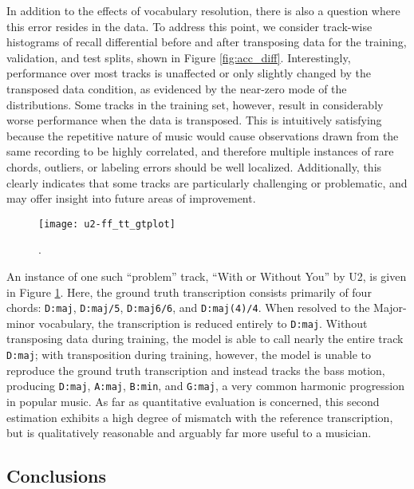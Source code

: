 In addition to the effects of vocabulary resolution, there is also a question where this error resides in the data.
To address this point, we consider track-wise histograms of recall differential before and after transposing data for the training, validation, and test splits, shown in Figure \ref{fig:acc_diff}.
Interestingly, performance over most tracks is unaffected or only slightly changed by the transposed data condition, as evidenced by the near-zero mode of the distributions.
Some tracks in the training set, however, result in considerably worse performance when the data is transposed.
This is intuitively satisfying because the repetitive nature of music would cause observations drawn from the same recording to be highly correlated, and therefore multiple instances of rare chords, outliers, or labeling errors should be well localized.
Additionally, this clearly indicates that some tracks are particularly challenging or problematic, and may offer insight into future areas of improvement.

\begin{figure}[!t]
\centering
\texttt{[image: u2-ff\_tt\_gtplot]}
\caption{.}
\label{fig:u2fu}
\end{figure}

An instance of one such ``problem'' track, ``With or Without You'' by U2, is given in Figure \ref{fig:u2fu}.
Here, the ground truth transcription consists primarily of four chords: \texttt{D:maj}, \texttt{D:maj/5}, \texttt{D:maj6/6}, and \texttt{D:maj(4)/4}.
When resolved to the Major-minor vocabulary, the transcription is reduced entirely to \texttt{D:maj}.
Without transposing data during training, the model is able to call nearly the entire track \texttt{D:maj}; with transposition during training, however, the model is unable to reproduce the ground truth transcription and instead tracks the bass motion, producing \texttt{D:maj}, \texttt{A:maj}, \texttt{B:min}, and \texttt{G:maj}, a very common harmonic progression in popular music.
As far as quantitative evaluation is concerned, this second estimation exhibits a high degree of mismatch with the reference transcription, but is qualitatively reasonable and arguably far more useful to a musician.

\subsection{Conclusions}
\label{subsec:conclusions}

